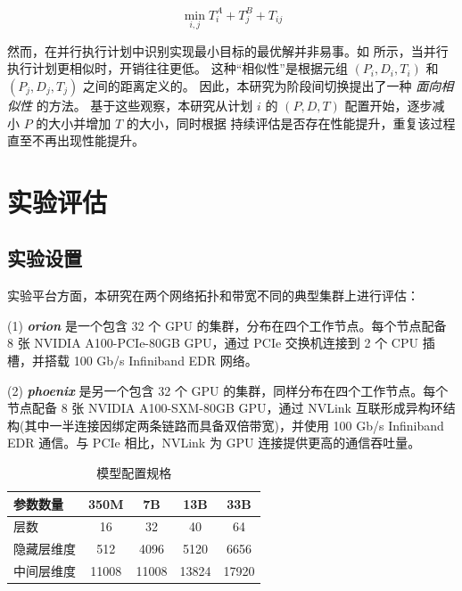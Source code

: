 \begin{equation}
    \label{equation:inter-stage-goal}
    \min_{i,j} T^A_i + T^B_j+T_{ij}
\end{equation}

然而，在并行执行计划中识别实现最小目标的最优解并非易事。如 所示，当并行执行计划更相似时，开销往往更低。
这种“相似性”是根据元组 $(P_i,D_i,T_i)$ 和 $(P_j,D_j,T_j)$ 之间的距离定义的。  
因此，本研究为阶段间切换提出了一种 \textit{面向相似性} 的方法。
基于这些观察，本研究从计划 $i$ 的 $(P,D,T)$ 配置开始，逐步减小 $P$ 的大小并增加 $T$ 的大小，同时根据 持续评估是否存在性能提升，重复该过程直至不再出现性能提升。


\section{实验评估}

\subsection{实验设置}  

实验平台方面，本研究在两个网络拓扑和带宽不同的典型集群上进行评估：  

(1) {\textit{\textbf{orion}}} 是一个包含 32 个 GPU 的集群，分布在四个工作节点。每个节点配备 8 张 NVIDIA A100-PCIe-80GB GPU，通过 PCIe 交换机连接到 2 个 CPU 插槽，并搭载 100 Gb/s Infiniband EDR 网络。  

(2) {\textit{\textbf{phoenix}}} 是另一个包含 32 个 GPU 的集群，同样分布在四个工作节点。每个节点配备 8 张 NVIDIA A100-SXM-80GB GPU，通过 NVLink 互联形成异构环结构(其中一半连接因绑定两条链路而具备双倍带宽)，并使用 100 Gb/s Infiniband EDR 通信。与 PCIe 相比，NVLink 为 GPU 连接提供更高的通信吞吐量。  

\begin{table}[h]
\caption{模型配置规格}
\label{table:model-info}
\small
\centering
\begin{tabular}{lcccc}
\toprule
参数数量      & 350M  & 7B       & 13B       & 33B       \\ 
\midrule
层数         & 16    & 32       & 40        & 64        \\
隐藏层维度   & 512   & 4096     & 5120      & 6656      \\
中间层维度   & 11008 & 11008    & 13824     & 17920     \\ 
\bottomrule
\end{tabular}
\end{table}



